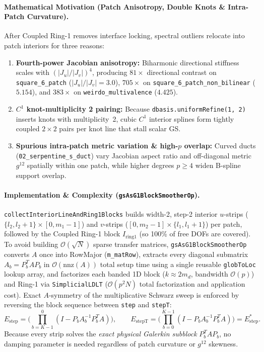 \documentclass[10pt,a4paper]{article}
\begin{document}
\paragraph{Mathematical Motivation (Patch Anisotropy, Double Knots \& Intra-Patch Curvature).}
After Coupled Ring-1 removes interface locking, spectral outliers relocate into patch interiors for three reasons:
\begin{enumerate}
  \item \textbf{Fourth-power Jacobian anisotropy:} Biharmonic directional stiffness scales with $(|J_u|/|J_v|)^4$, producing $81\times$ directional contrast on \texttt{square\_6\_patch} ($|J_u|/|J_v| = 3.0$), $705\times$ on \texttt{square\_6\_patch\_non\_bilinear} ($5.154$), and $383\times$ on \texttt{weirdo\_multivalence} ($4.425$).
  \item \textbf{$C^1$ knot-multiplicity 2 pairing:} Because \texttt{dbasis.uniformRefine(1, 2)} inserts knots with multiplicity~2, cubic $C^1$ interior splines form tightly coupled $2\times 2$ pairs per knot line that stall scalar GS.
  \item \textbf{Spurious intra-patch metric variation & high-$p$ overlap:} Curved ducts (\texttt{02\_serpentine\_s\_duct}) vary Jacobian aspect ratio and off-diagonal metric $g^{12}$ spatially within one patch, while higher degrees $p \ge 4$ widen B-spline support overlap.
\end{enumerate}

\paragraph{Implementation \& Complexity (\texttt{gsAsG1BlockSmootherOp}).}
\texttt{collectInteriorLineAndRing1Blocks} builds width-2, step-2 interior $u$-strips ($\{l_2, l_2+1\} \times [0, m_1-1]$) and $v$-strips ($[0, m_2-1] \times \{l_1, l_1+1\}$) per patch, followed by the Coupled Ring-1 block $I_{\text{ring1}}$ (so 100\% of free DOFs are covered). To avoid building $\mathcal{O}(\sqrt{N})$ sparse transfer matrices, \texttt{gsAsG1BlockSmootherOp} converts $A$ once into RowMajor (\texttt{m\_matRow}), extracts every diagonal submatrix $A_b = P_b^T A P_b$ in $\mathcal{O}(\text{nnz}(A))$ total setup time using a single reusable \texttt{globToLoc} lookup array, and factorizes each banded 1D block ($k \approx 2 m_d$, bandwidth $\mathcal{O}(p)$) and Ring-1 via \texttt{SimplicialLDLT} ($\mathcal{O}(p^2 N)$ total factorization and application cost). Exact $A$-symmetry of the multiplicative Schwarz sweep is enforced by reversing the block sequence between \texttt{step} and \texttt{stepT}:
\[
  E_{\text{step}} = \Big(\prod_{b=K-1}^{0} (I - P_b A_b^{-1} P_b^T A)\Big), \qquad
  E_{\text{stepT}} = \Big(\prod_{b=0}^{K-1} (I - P_b A_b^{-1} P_b^T A)\Big) = E_{\text{step}}^*.
\]
Because every strip solves the \emph{exact physical Galerkin subblock} $P_b^T A P_b$, no damping parameter is needed regardless of patch curvature or $g^{12}$ skewness.
\end{document}
